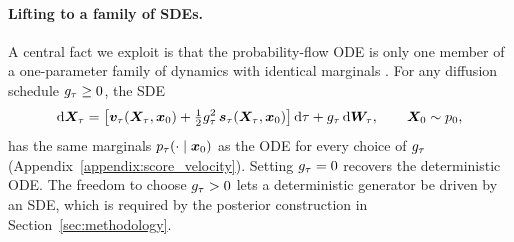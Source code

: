 \paragraph{Lifting to a family of SDEs.}
A central fact we exploit is that the probability-flow ODE is only one member of a one-parameter family of dynamics with identical marginals \cite{song_score-based_2021, ma_sit_2024}. For any diffusion schedule $g_\tau\ge 0$, the SDE
\begin{align}\label{eq:general_sde_family}
    \mathrm{d}\boldsymbol{X}_\tau
    = \left[\bm{v}_\tau(\boldsymbol{X}_\tau,\boldsymbol{x}_0) + \tfrac{1}{2}g_\tau^2\,\bm{s}_\tau(\boldsymbol{X}_\tau,\boldsymbol{x}_0)\right]\mathrm{d}\tau
    + g_\tau\,\mathrm{d}\boldsymbol{W}_\tau, \qquad \boldsymbol{X}_0\sim p_0,
\end{align}
has the same marginals $p_\tau(\cdot\mid\boldsymbol{x}_0)$ as the ODE for every choice of $g_\tau$ (Appendix~\ref{appendix:score_velocity}). Setting $g_\tau=0$ recovers the deterministic ODE. The freedom to choose $g_\tau>0$ lets a deterministic generator be driven by an SDE, which is required by the posterior construction in Section~\ref{sec:methodology}.

